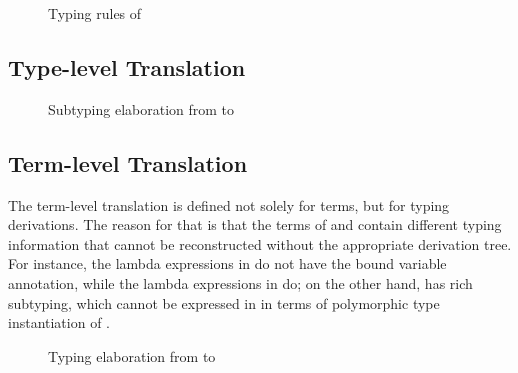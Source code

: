 \documentclass[acmsmall,natbib=false,review,anonymous]{acmart}
\begin{document}
\begin{figure}[h]
  \ottdefnSFtyLabeled{}
  \ottdefnSFtyALabeled{}
  \caption{Typing rules of \systemf}
  \label{fig:systemf-typing}
\end{figure}

\begin{figure}[h]
  \ottdefnSFWFLabeled{}
\end{figure}

\subsection{Type-level Translation}

\begin{figure}[h]
  \ottfundefnunpolP{}
  \ottfundefnunpolN{}
\end{figure}

\begin{figure}[h]
  \ottdefnELNLabeled{}
  \ottdefnELPLabeled{}
  \caption{Subtyping elaboration from \fexists to \systemf}
  \label{fig:subt-elaboration}
\end{figure}





\subsection{Term-level Translation}

The term-level translation is defined not solely for terms, but for typing
derivations. The reason for that is that the terms of \systemf and \fexists
contain different typing information that cannot be reconstructed without the
appropriate derivation tree. For instance, the lambda expressions in \systemf do
not have the bound variable annotation, while the lambda expressions in \fexists
do; on the other hand, \fexists has rich subtyping, which cannot be expressed in
in terms of polymorphic type instantiation of \systemf.

\begin{figure}[h]
  \ottdefnTELPLabeled{}
  \caption{Typing elaboration from \fexists to \systemf}
  \label{fig:typing-elaboration}
\end{figure}

\begin{figure}[h]
  \ottdefnTELNLabeled{}
\end{figure}
\end{document}
